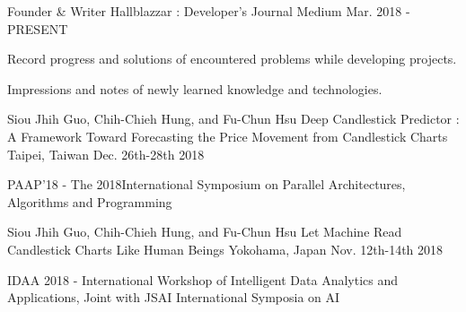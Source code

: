 

\begin{cventries}

    \cventry
        {Founder \& Writer} %
        {Hallblazzar : Developer's Journal} %
        {Medium} %
        {Mar. 2018 - PRESENT} %
        {
          \begin{cvitems} %
            \item {Record progress and solutions of encountered problems while developing projects.} 
            \item {Impressions and notes of newly learned knowledge and technologies.}
          \end{cvitems}
        }
        
    \cventry
        {Siou Jhih Guo, Chih-Chieh Hung, and Fu-Chun Hsu}
        {Deep Candlestick Predictor : A Framework Toward Forecasting the Price Movement from Candlestick Charts}
        {Taipei, Taiwan}
        {Dec. 26th-28th 2018}
        {
            \begin{cvitems}
                \item {PAAP’18 - The 2018International Symposium on Parallel Architectures, Algorithms and Programming}
            \end{cvitems}
        }
    
    \cventry
        {Siou Jhih Guo, Chih-Chieh Hung, and Fu-Chun Hsu}
        {Let Machine Read Candlestick Charts Like Human Beings}
        {Yokohama, Japan}
        {Nov. 12th-14th 2018}
        {
            \begin{cvitems}
                \item {IDAA 2018 - International Workshop of Intelligent Data Analytics and Applications, Joint with JSAI International Symposia on AI}
            \end{cvitems}
        }
        
\end{cventries}
